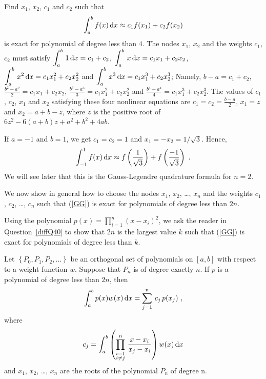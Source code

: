\begin{egg}
Find $x_1$, $x_2$, $c_1$ and $c_2$ such that
\[
\int_a^b f(x) \,\mathrm{d}x \approx c_1 f(x_1) + c_2 f(x_2)
\]
is exact for polynomial of degree less than $4$.   The nodes $x_1$,
$x_2$ and the weights $c_1$, $c_2$ must satisfy
$\displaystyle \int_a^b\, 1 \,\mathrm{d}x = c_1 + c_2$,
$\displaystyle \int_a^b\, x \,\mathrm{d}x = c_1 x_1 + c_2 x_2$,
$\displaystyle \int_a^b\, x^2 \,\mathrm{d}x = c_1 x_1^2 + c_2 x_2^2$ and
$\displaystyle \int_a^b\, x^3 \,\mathrm{d}x = c_1 x_1^3 + c_2 x_2^3$;
Namely, $b-a = c_1 + c_2$,
$\displaystyle \frac{b^2-a^2}{2} = c_1 x_1 + c_2 x_2$,
$\displaystyle \frac{b^3-a^3}{3} = c_1 x_1^2 + c_2 x_2^2$ and
$\displaystyle \frac{b^4-a^4}{4} = c_1 x_1^3 + c_2 x_2^3$.
The values of $c_1$, $c_2$, $x_1$ and $x_2$ satisfying these four
nonlinear equations are 
$\displaystyle c_1 = c_2 = \frac{b-a}{2}$, $x_1 = z$ and
$x_2 = a+b-z$, where $z$ is the positive root of
$6z^2 - 6(a+b)z + a^2 + b^2 + 4ab$.

If $a=-1$ and $b=1$, we get $c_1 = c_2 = 1$ and
$x_1 = -x_2 = 1/\sqrt{3}$.
Hence,
\[
\int_{-1}^1 f(x) \,\mathrm{d}x \approx  f\left(\frac{1}{\sqrt{3}}\right) +
f\left(\frac{-1}{\sqrt{3}}\right) \  .
\]
We will see later that this is the Gauss-Legendre quadrature formula
for $n=2$.
\end{egg}

We now show in general how to choose the nodes $x_1$, $x_2$, \ldots,
$x_n$ and the weights $c_1$, $c_2$, \ldots, $c_n$ such that (\ref{GG})
is exact for polynomials of degree less than $2n$.

\begin{rmk}
Using the polynomial
$\displaystyle p(x) = \prod_{i=1}^n (x-x_i)^2$, we ask the reader in
Question~\ref{diffQ40} to show that $2n$ is the largest value $k$ such
that (\ref{GG}) is exact for polynomials of degree less than $k$.
\end{rmk}

\begin{theorem}
Let $\left\{ P_0,P_1,P_2,\ldots \right\}$ be an orthogonal set of
polynomials on $[a,b]$ with respect to a weight function $w$.
Suppose that $P_n$ is of degree exactly $n$.  If $p$ is a
polynomial of degree less than $2n$, then
\[
\int_a^b p(x)w(x)\,\mathrm{d}x = \sum_{j=1}^n \, c_j \, p(x_j) \ ,
\]
where
\[
c_j = \int_a^b \left(
\prod_{\substack{i=1\\i\not=j}}^n\,\frac{x-x_i}{x_j-x_i}\right) w(x)\,\mathrm{d}x
\]
and $x_1$, $x_2$, \ldots, $x_n$ are the roots of the polynomial
$P_n$ of degree n.
\label{Gaussquadr}
\end{theorem}

